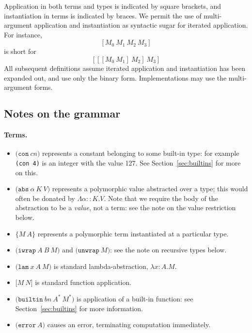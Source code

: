 \documentclass[a4paper]{article}
\newcommand{\keyword}[1]{\texttt{#1}}
\newcommand{\construct}[1]{\texttt{(} #1 \texttt{)}}
\newcommand{\con}[1]{\construct{\keyword{con} ~ #1}}
\newcommand{\abs}[3]{\construct{\keyword{abs} ~ #1 ~ #2 ~ #3}}
\newcommand{\inst}[2]{\texttt{\{}#1 ~ #2\texttt{\}}}
\newcommand{\lam}[3]{\construct{\keyword{lam} ~ #1 ~ #2 ~ #3}}
\newcommand{\app}[2]{\texttt{[} #1 ~ #2 \texttt{]}}
\newcommand{\iwrap}[3]{\construct{\keyword{iwrap} ~ #1 ~ #2 ~ #3}}
\newcommand{\unwrap}[1]{\construct{\keyword{unwrap} ~ #1}}
\newcommand{\builtin}[3]{\construct{\keyword{builtin} ~ #1 ~ #2 ~ #3}}
\newcommand{\error}[1]{\construct{\keyword{error} ~ #1}}
\begin{document}
Application in both terms and types is indicated by square
brackets, and instantiation in terms is indicated by braces. We
permit the use of multi-argument application and instantiation as
syntactic sugar for iterated application.
For instance,
\[
  [M_0 ~ M_1 ~ M_2 ~ M_3]
  \]
\noindent is short for
\[
  [[[M_0 ~ M_1] ~ M_2] ~ M_3]
\]
All subsequent definitions assume iterated application and instantiation
has been expanded out, and use only the binary form. Implementations
may use the multi-argument forms.






\newcommand\fixtype[1]{\mu\,\alpha.#1}  %

\subsection{Notes on the grammar}
\paragraph{Terms.}
\begin{itemize}
\item $\con{cn}$ represents a constant belonging to some built-in
  type: for example \texttt{(con 4)} is an integer with the value 127.
  See Section~\ref{sec:builtins} for more on this.
\item $\abs{\alpha}{K}{V}$ represents a polymorphic value abstracted
  over a type; this would often be donated by $\Lambda\alpha{::}K.V$.
  Note that we require the body of the abstraction to be a
  \textit{value}, not a term: see the note on the value restriction below.
\item $\inst{M}{A}$ represents a polymorphic term instantiated at a particular type.
\item $\iwrap{A}{B}{M}$ and $\unwrap{M}$: see the note on recursive types below.
\item $\lam{x}{A}{M}$ is standard lambda-abstraction, $\lambda{}x{:}{A}.{M}$.
\item $\app{M}{N}$ is standard function application.
\item $\builtin{bn}{A^*}{M^*}$ is application of a built-in function: see Section~\ref{sec:builtins} for more information.
\item $\error{A}$ causes an error, terminating computation immediately.
\end{itemize}
\end{document}
